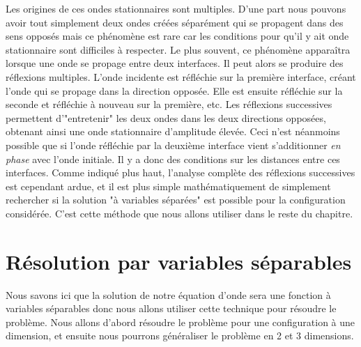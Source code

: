 Les origines de ces ondes stationnaires sont multiples. D'une part nous pouvons avoir tout simplement deux ondes créées séparément qui se propagent dans des sens opposés mais ce phénomène est rare car les conditions pour qu'il y ait onde stationnaire sont difficiles à respecter. Le plus souvent, ce phénomène apparaîtra lorsque une onde se propage entre deux interfaces. Il peut alors se produire des réflexions multiples. L'onde incidente est réfléchie sur la première interface, créant l'onde qui se propage dans la direction opposée. Elle est ensuite  réfléchie sur la seconde et réfléchie à nouveau sur la première, etc. Les réflexions successives permettent d'"entretenir" les deux ondes dans les deux directions opposées, obtenant ainsi une onde stationnaire d'amplitude élevée. Ceci n'est néanmoins possible que si l'onde réfléchie par la deuxième interface vient s'additionner {\it en phase} avec l'onde initiale. Il y a donc des conditions sur les distances entre ces interfaces. Comme indiqué plus haut, l'analyse complète des réflexions successives est cependant ardue, et il est plus simple mathématiquement de simplement rechercher si la solution "à variables séparées" est possible pour la configuration considérée. C'est cette méthode que nous allons utiliser dans le reste du chapitre.


\section{Résolution par variables séparables}
Nous savons ici que la solution de notre équation d'onde sera une fonction à variables séparables donc nous allons utiliser cette technique pour résoudre le problème. Nous allons d'abord résoudre le problème pour une configuration à une dimension, et ensuite nous pourrons généraliser le problème en 2 et 3 dimensions.

